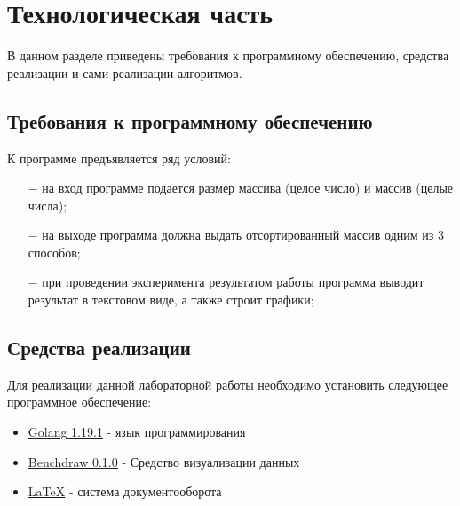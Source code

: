 \chapter{Технологическая часть}
В данном разделе приведены требования к программному обеспечению, средства реализации и сами реализации алгоритмов.

\section{Требования к программному обеспечению}
К программе предъявляется ряд условий:
\begin{itemize}
    \item[$-$] на вход программе подается размер массива (целое число) и массив (целые числа);
    \item[$-$] на выходе программа должна выдать отсортированный массив одним из 3 способов;
    \item[$-$] при проведении эксперимента результатом работы программа
    выводит результат в текстовом виде, а также строит графики;
\end{itemize}

\section{Средства реализации}
Для реализации данной лабораторной работы необходимо установить следующее программное обеспечение:
\begin{itemize}
    \item \href{https://go.dev/}{Golang 1.19.1} - язык программирования
    \item \href{https://github.com/cep21/benchdraw}{Benchdraw 0.1.0} - Средство визуализации данных
    \item \href{https://www.latex-project.org/}{LaTeX} - система документооборота
\end{itemize}
\newpage

